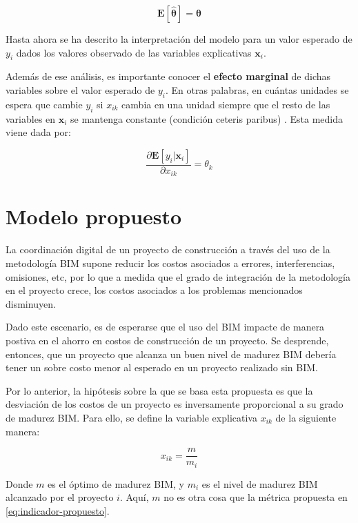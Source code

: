 \begin{equation}
    \bm{E}[\hat{\bm{\theta}}] = \bm{\theta}
\end{equation}

Hasta ahora se ha descrito la interpretación del modelo para un valor esperado de $y_i$ dados los valores observado de las variables explicativas $\bm{x}_i$.

Además de ese análisis, es importante conocer el \textbf{efecto marginal} de dichas variables sobre el valor esperado de $y_i$. En otras palabras, en cuántas unidades se espera que cambie $y_i$ si $x_{ik}$ cambia en una unidad siempre que el resto de las variables en $\bm{x}_i$ se mantenga constante (condición ceteris paribus) \cite{hansen2018}. Esta medida viene dada por:

\begin{equation}
    \label{eq.efec_marginal}
    \frac{\partial \bm{E}[y_i|\bm{x}_i]}{\partial x_{ik}} =\theta_k
\end{equation}

\section{Modelo propuesto}

La coordinación digital de un proyecto de construcción a través del uso de la metodología BIM supone reducir los costos asociados a errores, interferencias, omisiones, etc, por lo que a medida que el grado de integración de la metodología en el proyecto crece, los costos asociados a los problemas mencionados disminuyen.

Dado este escenario, es de esperarse que el uso del BIM impacte de manera postiva en el ahorro en costos de construcción de un proyecto. Se desprende, entonces, que un proyecto que alcanza un buen nivel de madurez BIM debería tener un sobre costo menor al esperado en un proyecto realizado sin BIM.

Por lo anterior, la hipótesis sobre la que se basa esta propuesta es que la desviación de los costos de un proyecto es inversamente proporcional a su grado de madurez BIM. Para ello, se define la variable explicativa $x_{ik}$ de la siguiente manera:

\begin{equation}
    x_{ik} = \frac{m}{m_i}
\end{equation}

Donde $m$ es el óptimo de madurez BIM, y $m_i$ es el nivel de madurez BIM alcanzado por el proyecto $i$. Aquí, $m$ no es otra cosa que la métrica propuesta en \eqref{eq:indicador-propuesto}.

